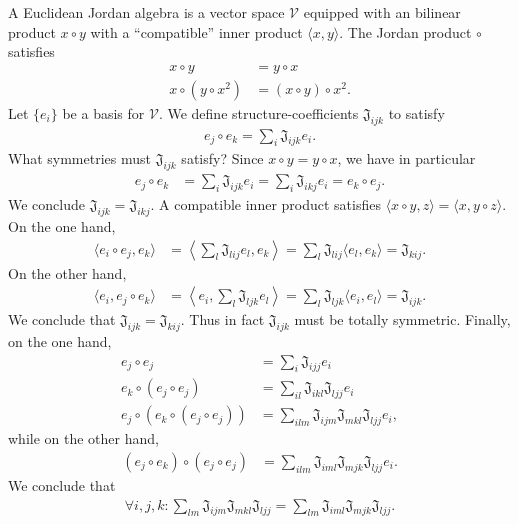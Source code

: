 \documentclass[11pt]{article}
\begin{document}
\begin{enumerate}
\begin{enumerate}
A Euclidean Jordan algebra is a vector space $\mathcal{V}$ equipped with an bilinear product $x \circ y$ with a ``compatible'' inner product $\langle x, y\rangle$. The Jordan product $\circ$ satisfies
\begin{align}
x \circ y &= y \circ x\\
x \circ (y \circ x^2)&= (x\circ y)\circ x^2.
\end{align}
Let $\{e_i\}$ be a basis for $\mathcal{V}$. We define structure-coefficients $\mathfrak{J}_{ijk}$ to satisfy
\begin{align}
e_j \circ e_k = \sum_i \mathfrak{J}_{ijk}e_i	.
\end{align}
What symmetries must $\mathfrak{J}_{ijk}$ satisfy? Since $x \circ y = y \circ x$, we have in particular
\begin{align}
e_j \circ e_k &= \sum_i \mathfrak{J}_{ijk}e_i	=\sum_i \mathfrak{J}_{ikj}e_i	=e_k \circ e_j.	
\end{align}
We conclude $\mathfrak{J}_{ijk}=\mathfrak{J}_{ikj}$. A compatible inner product satisfies $\langle x\circ y, z\rangle=\langle x,y\circ z\rangle$. On the one hand,
\begin{align}
\langle e_i \circ e_j, e_k\rangle &= \left\langle \sum_l \mathfrak{J}_{lij}e_l, e_k\right\rangle = \sum_l\mathfrak{J}_{lij}\langle e_l, e_k\rangle=\mathfrak{J}_{kij}.	
\end{align}
On the other hand,
\begin{align}
\langle e_i , e_j \circ e_k\rangle &= \left\langle e_i,\sum_l \mathfrak{J}_{ljk}e_l\right\rangle = \sum_l\mathfrak{J}_{ljk}\langle e_i, e_l\rangle=\mathfrak{J}_{ijk}.	
\end{align}
We conclude that $\mathfrak{J}_{ijk}=\mathfrak{J}_{kij}$. Thus in fact $\mathfrak{J}_{ijk}$ must be totally symmetric. Finally, on the one hand,
\begin{align}
e_j \circ e_j &= \sum_i \mathfrak{J}_{ijj}e_i\\
e_k \circ (e_j \circ e_j)&=\sum_{il}\mathfrak{J}_{ikl}\mathfrak{J}_{ljj}e_i\\
e_j \circ (e_k \circ (e_j \circ e_j))&=\sum_{ilm}\mathfrak{J}_{ijm}\mathfrak{J}_{mkl}\mathfrak{J}_{ljj} e_i,
\end{align}
while on the other hand,
\begin{align}
	(e_j \circ e_k) \circ (e_j \circ e_j)&= \sum_{ilm} \mathfrak{J}_{iml}\mathfrak{J}_{mjk}\mathfrak{J}_{ljj}e_i.
\end{align}
We conclude that
\begin{align}
\forall i, j,k: \sum_{lm}\mathfrak{J}_{ijm}\mathfrak{J}_{mkl}\mathfrak{J}_{ljj} =	\sum_{lm} \mathfrak{J}_{iml}\mathfrak{J}_{mjk}\mathfrak{J}_{ljj}.

\end{align}
\end{enumerate}
\end{enumerate}
\end{document}
